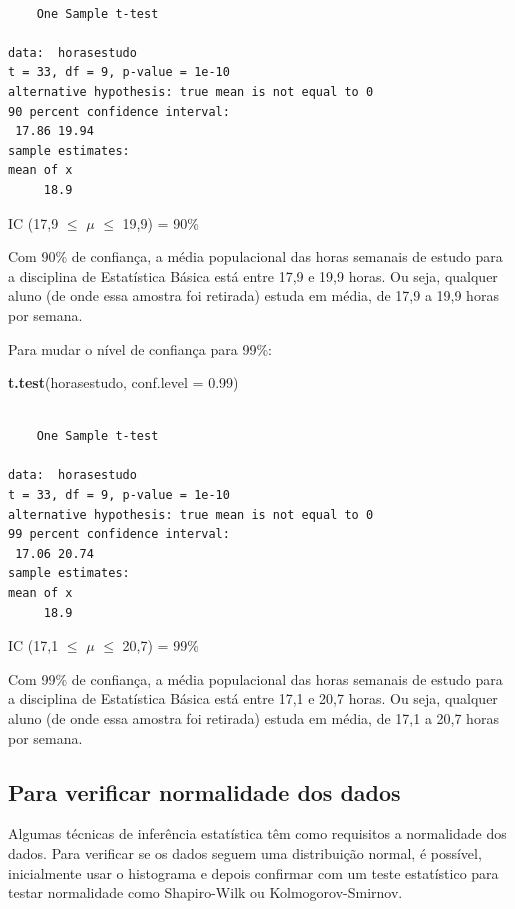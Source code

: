 \documentclass[12pt,brazil,oneside]{book}
\newenvironment{Shaded}{\begin{snugshade}}{\end{snugshade}}
\newcommand{\DataTypeTok}[1]{\textcolor[rgb]{0.13,0.29,0.53}{#1}}
\newcommand{\FloatTok}[1]{\textcolor[rgb]{0.00,0.00,0.81}{#1}}
\newcommand{\KeywordTok}[1]{\textcolor[rgb]{0.13,0.29,0.53}{\textbf{#1}}}
\newcommand{\NormalTok}[1]{#1}
\begin{document}
\begin{verbatim}

    One Sample t-test

data:  horasestudo
t = 33, df = 9, p-value = 1e-10
alternative hypothesis: true mean is not equal to 0
90 percent confidence interval:
 17.86 19.94
sample estimates:
mean of x 
     18.9 
\end{verbatim}

IC (17,9 \(\leq\) \(\mu\) \(\leq\) 19,9) = 90\%

Com 90\% de confiança, a média populacional das horas semanais de estudo para a disciplina de Estatística Básica está entre 17,9 e 19,9 horas. Ou seja, qualquer aluno (de onde essa amostra foi retirada) estuda em média, de 17,9 a 19,9 horas por semana.

Para mudar o nível de confiança para 99\%:

\begin{Shaded}
\begin{Highlighting}[]
\KeywordTok{t.test}\NormalTok{(horasestudo, }\DataTypeTok{conf.level =} \FloatTok{0.99}\NormalTok{)}
\end{Highlighting}
\end{Shaded}

\begin{verbatim}

    One Sample t-test

data:  horasestudo
t = 33, df = 9, p-value = 1e-10
alternative hypothesis: true mean is not equal to 0
99 percent confidence interval:
 17.06 20.74
sample estimates:
mean of x 
     18.9 
\end{verbatim}

IC (17,1 \(\leq\) \(\mu\) \(\leq\) 20,7) = 99\%

Com 99\% de confiança, a média populacional das horas semanais de estudo para a disciplina de Estatística Básica está entre 17,1 e 20,7 horas. Ou seja, qualquer aluno (de onde essa amostra foi retirada) estuda em média, de 17,1 a 20,7 horas por semana.

\hypertarget{para-verificar-normalidade-dos-dados}{%
\subsection{Para verificar normalidade dos dados}\label{para-verificar-normalidade-dos-dados}}

Algumas técnicas de inferência estatística têm como requisitos a normalidade dos dados. Para verificar se os dados seguem uma distribuição normal, é possível, inicialmente usar o histograma e depois confirmar com um teste estatístico para testar normalidade como Shapiro-Wilk ou Kolmogorov-Smirnov.
\end{document}
